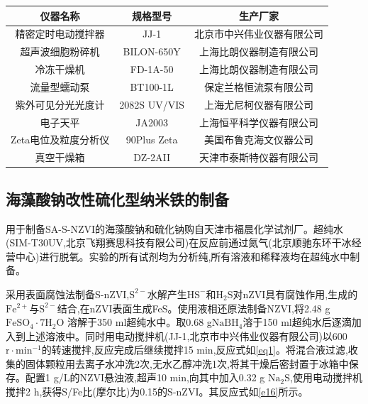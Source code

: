 \begin{table}[h]
	\centering
	\label{tab2}
	\begin{tabular}{@{}ccc@{}}\toprule
		仪器名称&规格型号&生产厂家\\\midrule
		精密定时电动搅拌器&JJ-1&北京市中兴伟业仪器有限公司\\
        超声波细胞粉碎机&BILON-650Y&上海比朗仪器制造有限公司\\
		冷冻干燥机&FD-1A-50&上海比朗仪器制造有限公司\\
		流量型蠕动泵&BT100-1L&保定兰格恒流泵有限公司\\
		紫外可见分光光度计&2082S UV/VIS&上海尤尼柯仪器有限公司\\
		电子天平&JA2003&上海恒平科学仪器有限公司\\
        Zeta电位及粒度分析仪&90Plus Zeta&美国布鲁克海文仪器公司\\
        真空干燥箱&DZ-2AII&天津市泰斯特仪器有限公司\\\bottomrule
	\end{tabular}
\end{table}


\subsection{海藻酸钠改性硫化型纳米铁的制备}\label{material}

用于制备SA-S-NZVI的海藻酸钠和硫化钠购自天津市福晨化学试剂厂。超纯水(SIM-T30UV,北京飞翔赛思科技有限公司)在反应前通过氮气(北京顺驰东环干冰经营中心)进行脱氧。实验的所有试剂均为分析纯,所有溶液和稀释液均在超纯水中制备。

采用表面腐蚀法制备S-nZVI,$\mathrm{S^{2-}}$水解产生$\mathrm{HS^-}$和$\mathrm{H_2S}$对nZVI具有腐蚀作用,生成的$\mathrm{Fe^{2+}}$与$\mathrm S^{2-}$结合,在nZVI表面生成FeS\cite{ ISI:000382805800072}。使用液相还原法制备NZVI\cite{2020The,LIU2019124193},将2.48 g$\mathrm{FeSO_4\cdot 7H_2O}$ 溶解于350 ml超纯水中。取0.68 g$\mathrm{NaBH_4}$溶于150 ml超纯水后逐滴加入到上述溶液中。同时用电动搅拌机(JJ-1,北京市中兴伟业仪器有限公司)以600 $\mathrm{r\cdot min^{-1}}$的转速搅拌,反应完成后继续搅拌15 min,反应式如\cref{eq1}。将混合液过滤,收集的固体颗粒用去离子水冲洗2次,无水乙醇冲洗1次,将其干燥后密封置于冰箱中保存。配置1 g/L的NZVI悬浊液,超声10 min,向其中加入0.32 g $\mathrm{{Na}_2S}$,使用电动搅拌机搅拌2 h,获得S/Fe比(摩尔比)为0.15的S-nZVI。其反应式如\cref{e16}所示\cite{ ISI:000355774400014}。

